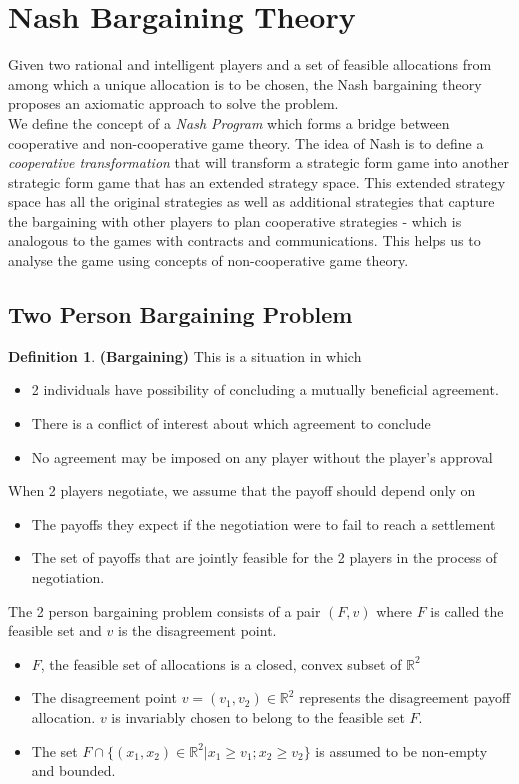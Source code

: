 \documentclass{article}
\theoremstyle{definition}
\newtheorem{defn}{Definition}[section]
\begin{document}
\section{Nash Bargaining Theory}
Given two rational and intelligent players and a set of feasible allocations from among which a unique allocation is to be chosen, the Nash bargaining theory proposes an axiomatic approach to solve the problem.\\
We define the concept of a \textit{Nash Program} which forms a bridge between cooperative and non-cooperative game theory. The idea of Nash is to define a \textit{cooperative transformation} that will transform a strategic form game into another strategic form game that has an extended strategy space. This extended strategy space has all the original strategies as well as additional strategies that capture the bargaining with other players to plan cooperative strategies - which is analogous to the games with contracts and communications. This helps us to analyse the game using concepts of non-cooperative game theory.
\subsection{Two Person Bargaining Problem}
\begin{defn}
\textbf{(Bargaining)} This is a situation in which \begin{itemize}
	\item 2 individuals have possibility of concluding a mutually beneficial agreement.
	\item There is a conflict of interest about which agreement to conclude
	\item No agreement may be imposed on any player without the player's approval
\end{itemize}
\end{defn}
\noindent When 2 players negotiate, we assume that the payoff should depend only on
\begin{itemize}
	\item The payoffs they expect if the negotiation were to fail to reach a settlement
	\item The set of payoffs that are jointly feasible for the 2 players in the process of negotiation.
\end{itemize}
The 2 person bargaining problem consists of a pair $(F,v)$ where $F$ is called the feasible set and $v$ is the disagreement point.
\begin{itemize}
	\item $F$, the feasible set of allocations is a closed, convex subset of $\mathbb{R}^2$
	\item The disagreement point $v = (v_1,v_2)\in \mathbb{R}^2$ represents the disagreement payoff allocation. $v$ is invariably chosen to belong to the feasible set $F$.
	\item  The set $F\cap \{(x_1,x_2)\in \mathbb{R}^2| x_1\geq v_1;x_2\geq v_2\}$ is assumed to be non-empty and bounded.
\end{itemize}
\end{document}
